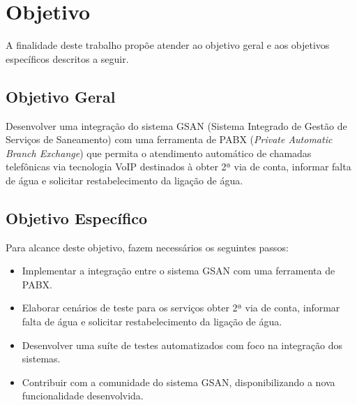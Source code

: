 \section*{Objetivo}

A finalidade deste trabalho propõe atender ao objetivo geral e aos objetivos específicos descritos a seguir.

\subsection*{Objetivo Geral}

Desenvolver uma integração do sistema GSAN (Sistema Integrado de Gestão de Serviços de Saneamento) com uma ferramenta de PABX (\textit{Private Automatic Branch Exchange}) que permita o atendimento automático de chamadas telefônicas via tecnologia VoIP destinados à obter 2ª via de conta, informar falta de água e solicitar restabelecimento da ligação de água.

\subsection*{Objetivo Específico}
Para alcance deste objetivo, fazem necessários os seguintes passos:
\begin{itemize}
	\item Implementar a integração entre o sistema GSAN com uma ferramenta de PABX.
	\item Elaborar cenários de teste para os serviços obter 2ª via de conta, informar falta de água e solicitar restabelecimento da ligação de água.
	\item Desenvolver uma suíte de testes automatizados com foco na integração dos sistemas. 
	\item Contribuir com a comunidade do sistema GSAN, disponibilizando a nova funcionalidade desenvolvida.
\end{itemize}